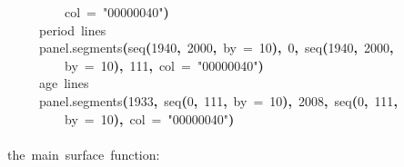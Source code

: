 \documentclass[a4paper]{article}
\newcommand{\hlnumber}[1]{\textcolor[rgb]{0.0823529411764706,0.0784313725490196,0.709803921568627}{#1}}%
\newcommand{\hlfunctioncall}[1]{\textcolor[rgb]{1,0,0}{#1}}%
\newcommand{\hlstring}[1]{\textcolor[rgb]{0.6,0.6,1}{#1}}%
\newcommand{\hlkeyword}[1]{\textcolor[rgb]{0,0,0}{\textbf{#1}}}%
\newcommand{\hlargument}[1]{\textcolor[rgb]{0.694117647058824,0.247058823529412,0.0196078431372549}{#1}}%
\newcommand{\hlcomment}[1]{\textcolor[rgb]{0.8,0.8,0.8}{#1}}%
\newcommand{\hlprompt}[1]{\textcolor[rgb]{0,0,0}{#1}}%
\newcommand{\hlstd}[1]{\textcolor[rgb]{0,0,0}{#1}}%
\newenvironment{Houtput}{\raggedright}{%
%
}
\begin{document}
\begin{Houtput}
\hlstd{}\hlprompt{{\ }}{\ }{\ }{\ }{\ }{\ }{\ }{\ }{\ }\hlargument{col}{\ }\hlargument{=}{\ }\hlstring{"\usebox{\hlnormalsizeboxhash}00000040"}\hlkeyword{)}\hspace*{\fill}\\
\hlstd{}\hlprompt{{\ }}{\ }{\ }{\ }{\ }\hlcomment{\usebox{\hlnormalsizeboxhash}{\ }period{\ }lines}\hspace*{\fill}\\
\hlstd{}\hlprompt{{\ }}{\ }{\ }{\ }{\ }\hlfunctioncall{panel.segments}\hlkeyword{(}\hlfunctioncall{seq}\hlkeyword{(}\hlnumber{1940}\hlkeyword{,}{\ }\hlnumber{2000}\hlkeyword{,}{\ }\hlargument{by}{\ }\hlargument{=}{\ }\hlnumber{10}\hlkeyword{)}\hlkeyword{,}{\ }\hlnumber{0}\hlkeyword{,}{\ }\hlfunctioncall{seq}\hlkeyword{(}\hlnumber{1940}\hlkeyword{,}{\ }\hlnumber{2000}\hlkeyword{,}\hspace*{\fill}\\
\hlstd{}\hlprompt{{\ }}{\ }{\ }{\ }{\ }{\ }{\ }{\ }{\ }\hlargument{by}{\ }\hlargument{=}{\ }\hlnumber{10}\hlkeyword{)}\hlkeyword{,}{\ }\hlnumber{111}\hlkeyword{,}{\ }\hlargument{col}{\ }\hlargument{=}{\ }\hlstring{"\usebox{\hlnormalsizeboxhash}00000040"}\hlkeyword{)}\hspace*{\fill}\\
\hlstd{}\hlprompt{{\ }}{\ }{\ }{\ }{\ }\hlcomment{\usebox{\hlnormalsizeboxhash}{\ }age{\ }lines}\hspace*{\fill}\\
\hlstd{}\hlprompt{{\ }}{\ }{\ }{\ }{\ }\hlfunctioncall{panel.segments}\hlkeyword{(}\hlnumber{1933}\hlkeyword{,}{\ }\hlfunctioncall{seq}\hlkeyword{(}\hlnumber{0}\hlkeyword{,}{\ }\hlnumber{111}\hlkeyword{,}{\ }\hlargument{by}{\ }\hlargument{=}{\ }\hlnumber{10}\hlkeyword{)}\hlkeyword{,}{\ }\hlnumber{2008}\hlkeyword{,}{\ }\hlfunctioncall{seq}\hlkeyword{(}\hlnumber{0}\hlkeyword{,}{\ }\hlnumber{111}\hlkeyword{,}\hspace*{\fill}\\
\hlstd{}\hlprompt{{\ }}{\ }{\ }{\ }{\ }{\ }{\ }{\ }{\ }\hlargument{by}{\ }\hlargument{=}{\ }\hlnumber{10}\hlkeyword{)}\hlkeyword{,}{\ }\hlargument{col}{\ }\hlargument{=}{\ }\hlstring{"\usebox{\hlnormalsizeboxhash}00000040"}\hlkeyword{)}\hspace*{\fill}\\
\hlstd{}\hlprompt{{\ }}\hlkeyword{\usebox{\hlnormalsizeboxclosebrace}}\mbox{}
\normalfont
\hspace*{\fill}\\
\hlstd{}\ttfamily\noindent
\hlprompt{\usebox{\hlnormalsizeboxgreaterthan}{\ }}\hlcomment{\usebox{\hlnormalsizeboxhash}{\ }the{\ }main{\ }surface{\ }function:}\mbox{}

\end{Houtput}
\end{document}
